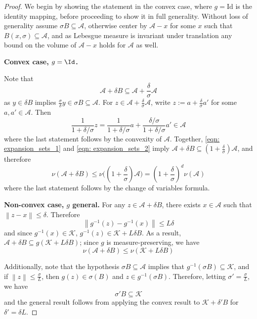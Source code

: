 \documentclass{article}
\newcommand{\norm}[1]{\left\lVert#1\right\rVert}
\newcommand{\1}{\mathbf{1}}
\theoremstyle{alden}
\theoremstyle{aldenthm}
\theoremstyle{remark}
\begin{document}
\begin{proof}
	We begin by showing the statement in the convex case, where $g = \mathrm{Id}$ is the identity mapping, before proceeding to show it in full generality. Without loss of generality assume $\sigma B \subseteq \mathcal{A}$, otherwise center by $\mathcal{A} - x$ for some $x$ such that $B(x,\sigma) \subseteq \mathcal{A}$, and as Lebesgue measure is invariant under translation any bound on the volume of $\mathcal{A} - x$ holds for $\mathcal{A}$ as well.
	
	\textbf{Convex case, $g = \Id$.}
	
	Note that 
	\begin{equation}
	\label{eqn: expansion_sets_1}
	\mathcal{A} + \delta B \subseteq \mathcal{A} + \frac{\delta}{\sigma}\mathcal{A}
	\end{equation}
	as $y \in \delta B$ implies $\frac{\sigma}{\delta}y \in \sigma B \subseteq \mathcal{A}$. For $z \in \mathcal{A} + \frac{\delta}{\sigma}\mathcal{A}$, write $z := a + \frac{\delta}{\sigma} a'$ for some $a,a' \in \mathcal{A}$. Then
	\begin{equation}
	\label{eqn: expansion_sets_2}
	\frac{1}{1 + \delta/\sigma}z = \frac{1}{1 + \delta/\sigma}a + \frac{\delta/\sigma}{1 + \delta/\sigma} a' \in \mathcal{A}
	\end{equation}
	where the last statement follows by the convexity of $\mathcal{A}$. Together, \eqref{eqn: expansion_sets_1} and \eqref{eqn: expansion_sets_2} imply $\mathcal{A} + \delta B \subseteq (1 + \frac{\delta}{\sigma})\mathcal{A}$, and therefore
	\begin{equation*}
	\nu(\mathcal{A} + \delta B) \leq \nu\Biggl(\left(1 + \frac{\delta}{\sigma}\right)\mathcal{A}\Biggr) = \left(1 + \frac{\delta}{\sigma}\right)^d \nu(\mathcal{A})
	\end{equation*}
	where the last statement follows by the change of variables formula.
	
	\textbf{Non-convex case, $g$ general.} For any $z \in \mathcal{A} + \delta B$, there exists $x \in \mathcal{A}$ such that $\norm{z - x} \leq \delta$. Therefore
	\begin{equation*}
	\norm{g^{-1}(z) - g^{-1}(x)} \leq L \delta
	\end{equation*}
	and since $g^{-1}(x) \in \mathcal{K}$, $g^{-1}(z) \in \mathcal{K} + L \delta B$. As a result, $\mathcal{A} + \delta B \subseteq g(\mathcal{K} + L \delta B)$; since $g$ is measure-preserving, we have
	\begin{equation*}
	\nu(\mathcal{A} + \delta B) \leq \nu(\mathcal{K} + L \delta B)
	\end{equation*}
	
	Additionally, note that the hypothesis $\sigma B \subseteq \mathcal{A}$ implies that $g^{-1}(\sigma B) \subseteq \mathcal{K}$, and if $\norm{z} \leq \frac{\sigma}{L}$, then $g(z) \in \sigma(B)$ and $z \in g^{-1}(\sigma B)$. Therefore, letting $\sigma' = \frac{\sigma}{L}$, we have
	\begin{equation*}
	\sigma' B \subseteq \mathcal{K}
	\end{equation*}
	and the general result follows from applying the convex result to $\mathcal{K} + \delta'B$ for $\delta' = \delta L$. 
\end{proof}
\end{document}
